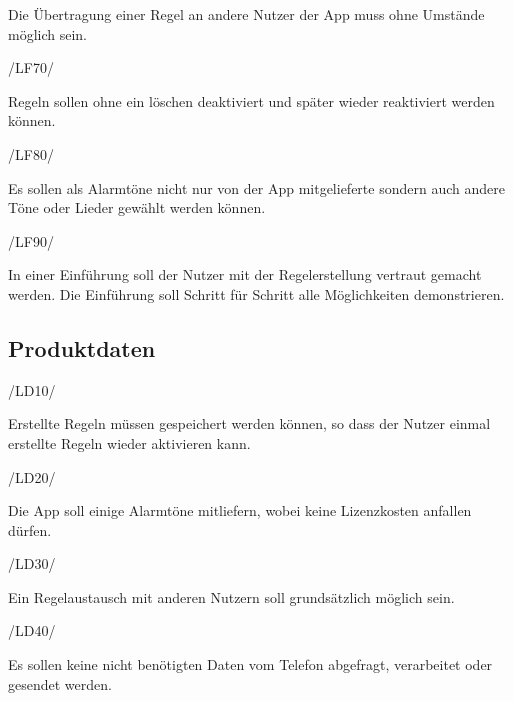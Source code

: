 \begin{minipage}{13cm}
Die \"Ubertragung einer Regel an andere Nutzer der App muss ohne Umst\"ande m\"oglich sein.\\
\end{minipage}
\begin{minipage}{3cm}
/LF70/
\end{minipage}
\begin{minipage}{13cm}
Regeln sollen ohne ein l\"oschen deaktiviert und sp\"ater wieder reaktiviert werden k\"onnen.\\
\end{minipage}
\begin{minipage}{3cm}
/LF80/
\end{minipage}
\begin{minipage}{13cm}
Es sollen als Alarmt\"one nicht nur von der App mitgelieferte sondern auch andere T\"one oder Lieder gew\"ahlt werden k\"onnen.\\
\end{minipage}
\begin{minipage}{3cm}
/LF90/
\end{minipage}
\begin{minipage}{13cm}
In einer Einf\"uhrung soll der Nutzer mit der Regelerstellung vertraut gemacht werden. Die Einf\"uhrung soll Schritt f\"ur Schritt alle M\"oglichkeiten demonstrieren.\\
\end{minipage}

\subsection{Produktdaten}
\begin{minipage}{3cm}
/LD10/
\end{minipage}
\begin{minipage}{13cm}
Erstellte Regeln m\"ussen gespeichert werden k\"onnen, so dass der Nutzer einmal erstellte Regeln wieder aktivieren kann.\\
\end{minipage}
\begin{minipage}{3cm}
/LD20/
\end{minipage}
\begin{minipage}{13cm}
Die App soll einige Alarmt\"one mitliefern, wobei keine Lizenzkosten anfallen d\"urfen.\\
\end{minipage}
\begin{minipage}{3cm}
/LD30/
\end{minipage}
\begin{minipage}{13cm}
Ein Regelaustausch mit anderen Nutzern soll grunds\"atzlich m\"oglich sein.\\
\end{minipage}
\begin{minipage}{3cm}
/LD40/
\end{minipage}
\begin{minipage}{13cm}
Es sollen keine nicht ben\"otigten Daten vom Telefon abgefragt, verarbeitet oder gesendet werden.\\
\end{minipage}

